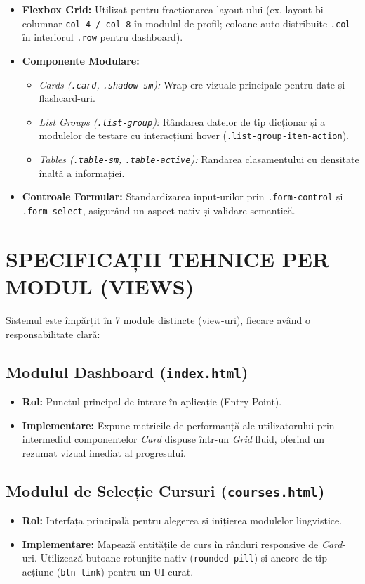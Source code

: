 \documentclass[11pt, a4paper]{article}
\begin{document}
\begin{itemize}
    \item \textbf{Flexbox Grid:} Utilizat pentru fracționarea layout-ului (ex. layout bi-columnar \texttt{col-4 / col-8} în modulul de profil; coloane auto-distribuite \texttt{.col} în interiorul \texttt{.row} pentru dashboard).
    \item \textbf{Componente Modulare:}
    \begin{itemize}
        \item \textit{Cards (\texttt{.card}, \texttt{.shadow-sm}):} Wrap-ere vizuale principale pentru date și flashcard-uri.
        \item \textit{List Groups (\texttt{.list-group}):} Rândarea datelor de tip dicționar și a modulelor de testare cu interacțiuni hover (\texttt{.list-group-item-action}).
        \item \textit{Tables (\texttt{.table-sm}, \texttt{.table-active}):} Randarea clasamentului cu densitate înaltă a informației.
    \end{itemize}
    \item \textbf{Controale Formular:} Standardizarea input-urilor prin \texttt{.form-control} și \texttt{.form-select}, asigurând un aspect nativ și validare semantică.
\end{itemize}

\section{SPECIFICAȚII TEHNICE PER MODUL (VIEWS)}
Sistemul este împărțit în 7 module distincte (view-uri), fiecare având o responsabilitate clară:

\subsection{Modulul Dashboard (\texttt{index.html})}
\begin{itemize}[label={}]
    \item \textbf{Rol:} Punctul principal de intrare în aplicație (Entry Point).
    \item \textbf{Implementare:} Expune metricile de performanță ale utilizatorului prin intermediul componentelor \textit{Card} dispuse într-un \textit{Grid} fluid, oferind un rezumat vizual imediat al progresului.
\end{itemize}

\subsection{Modulul de Selecție Cursuri (\texttt{courses.html})}
\begin{itemize}[label={}]
    \item \textbf{Rol:} Interfața principală pentru alegerea și inițierea modulelor lingvistice.
    \item \textbf{Implementare:} Mapează entitățile de curs în rânduri responsive de \textit{Card}-uri. Utilizează butoane rotunjite nativ (\texttt{rounded-pill}) și ancore de tip acțiune (\texttt{btn-link}) pentru un UI curat.
\end{itemize}
\end{document}
